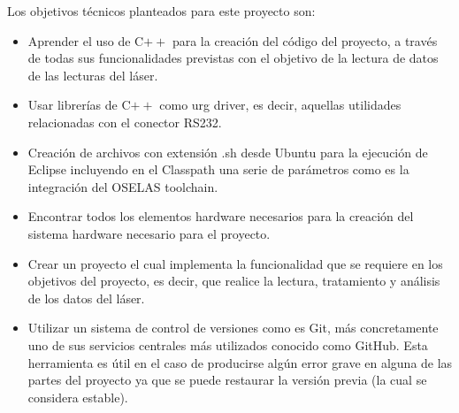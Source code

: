 Los objetivos técnicos planteados para este proyecto son:
\begin{itemize}
	\item Aprender el uso de C$ ++$ para la creación del código del proyecto, a través de todas sus funcionalidades previstas con el objetivo de la lectura de datos de las lecturas del láser.
	\item Usar librerías de C$ ++$ como urg driver, es decir, aquellas utilidades relacionadas con el conector RS232.
	\item Creación de archivos con extensión .sh desde Ubuntu para la ejecución de Eclipse incluyendo en el Classpath una serie de parámetros como es la integración del OSELAS toolchain.
	\item Encontrar todos los elementos hardware necesarios para la creación del sistema hardware necesario para el proyecto.
	\item Crear un proyecto el cual implementa la funcionalidad que se requiere en los objetivos del proyecto, es decir, que realice la lectura, tratamiento y análisis de los datos del láser.
	\item Utilizar un sistema de control de versiones como es Git, más concretamente uno de sus servicios centrales más utilizados conocido como GitHub. Esta herramienta es útil en el caso de producirse algún error grave en alguna de las partes del proyecto ya que se puede restaurar la versión previa (la cual se considera estable).
\end{itemize}

